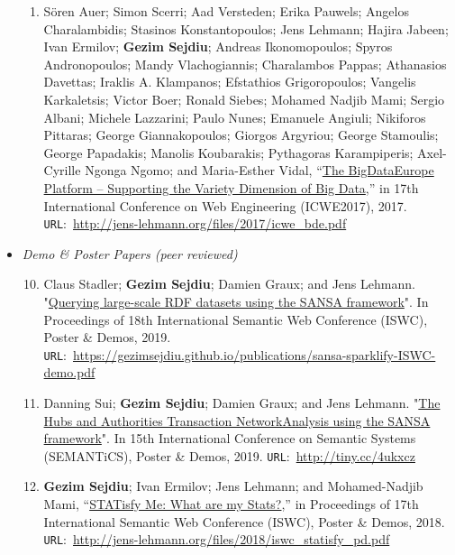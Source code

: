 \begin{itemize}
\begin{enumerate}
    \item Sören Auer; Simon Scerri; Aad Versteden; Erika Pauwels; Angelos Charalambidis; Stasinos Konstantopoulos; Jens Lehmann; Hajira Jabeen; Ivan Ermilov; \textbf{Gezim Sejdiu}; Andreas Ikonomopoulos; Spyros Andronopoulos; Mandy Vlachogiannis; Charalambos Pappas; Athanasios Davettas; Iraklis A. Klampanos; Efstathios Grigoropoulos; Vangelis Karkaletsis; Victor Boer; Ronald Siebes; Mohamed Nadjib Mami; Sergio Albani; Michele Lazzarini; Paulo Nunes; Emanuele Angiuli; Nikiforos Pittaras; George Giannakopoulos; Giorgos Argyriou; George Stamoulis; George Papadakis; Manolis Koubarakis; Pythagoras Karampiperis; Axel-Cyrille Ngonga Ngomo; and Maria-Esther Vidal, “\href{http://jens-lehmann.org/files/2017/icwe_bde.pdf}{The BigDataEurope Platform – Supporting the Variety Dimension of Big Data},” in 17th International Conference on Web Engineering (ICWE2017), 2017. \texttt{URL}:~\url{http://jens-lehmann.org/files/2017/icwe_bde.pdf}
     
\end{enumerate}
    \item \emph{Demo \& Poster Papers (peer reviewed)}
    \begin{enumerate}
    \setcounter{enumi}{9}

    \item Claus Stadler; \textbf{Gezim Sejdiu}; Damien Graux; and Jens Lehmann. "\href{https://gezimsejdiu.github.io/publications/sansa-sparklify-ISWC-demo.pdf}{Querying large-scale RDF datasets using the SANSA framework}".  In Proceedings of 18th International Semantic Web Conference (ISWC), Poster \& Demos, 2019. \texttt{URL}:~\url{https://gezimsejdiu.github.io/publications/sansa-sparklify-ISWC-demo.pdf}

    \item Danning Sui; \textbf{Gezim Sejdiu}; Damien Graux; and Jens Lehmann. "\href{https://gezimsejdiu.github.io/publications/sansa-hubs-and-authorities-transaction-semantics19-poster.pdf}{The Hubs and Authorities Transaction NetworkAnalysis using the SANSA framework}".  In 15th International Conference on Semantic Systems (SEMANTiCS), Poster \& Demos, 2019. \texttt{URL}:~\url{http://tiny.cc/4ukxcz}
    
    \item \textbf{Gezim Sejdiu}; Ivan Ermilov; Jens Lehmann; and Mohamed-Nadjib Mami, “\href{http://jens-lehmann.org/files/2018/iswc_statisfy_pd.pdf}{STATisfy Me: What are my Stats?},” in Proceedings of 17th International Semantic Web Conference (ISWC), Poster \& Demos, 2018. \texttt{URL}:~\url{http://jens-lehmann.org/files/2018/iswc_statisfy_pd.pdf}
    

\end{enumerate}
\end{itemize}
